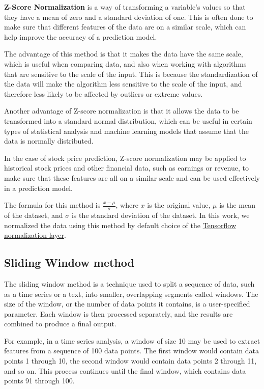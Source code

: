 \documentclass[a4paper]{article}
\begin{document}
\textbf{Z-Score Normalization} is a way of transforming a variable's values so that they have a mean of zero and a standard deviation of one. This is often done to make sure that different features of the data are on a similar scale, which can help improve the accuracy of a prediction model.

The advantage of this method is that it makes the data have the same scale, which is useful when comparing data, and also when working with algorithms that are sensitive to the scale of the input. This is because the standardization of the data will make the algorithm less sensitive to the scale of the input, and therefore less likely to be affected by outliers or extreme values.

Another advantage of Z-score normalization is that it allows the data to be transformed into a standard normal distribution, which can be useful in certain types of statistical analysis and machine learning models that assume that the data is normally distributed.

In the case of stock price prediction, Z-score normalization may be applied to historical stock prices and other financial data, such as earnings or revenue, to make sure that these features are all on a similar scale and can be used effectively in a prediction model. 

The formula for this method is $\frac{x-\mu}{\sigma}$, where $x$ is the original value, $\mu$ is the mean of the dataset, and $\sigma$ is the standard deviation of the dataset.  In this work, we normalized the data using this method by default choice of the \hyperlink{https://www.tensorflow.org/api_docs/python/tf/keras/layers/Normalization}{Tensorflow normalization layer}. 
\subsection{Sliding Window method} \label{window}

The sliding window method is a technique used to split a sequence of data, such as a time series or a text, into smaller, overlapping segments called windows. The size of the window, or the number of data points it contains, is a user-specified parameter. Each window is then processed separately, and the results are combined to produce a final output.

For example, in a time series analysis, a window of size 10 may be used to extract features from a sequence of 100 data points. The first window would contain data points 1 through 10, the second window would contain data points 2 through 11, and so on. This process continues until the final window, which contains data points 91 through 100.
\end{document}
